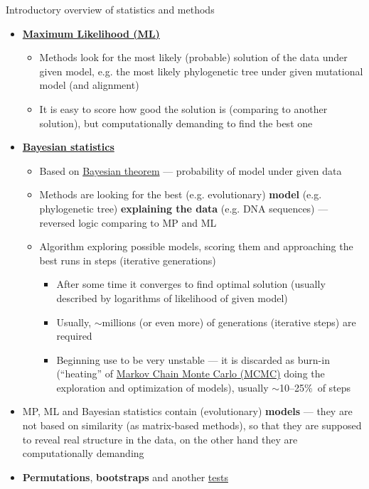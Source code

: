 \documentclass[compress, xelatex, 11pt, xcolor=svgnames, aspectratio=169,
	hyperref={
		bookmarks=true,
		unicode=true,
		colorlinks=true,
		pdftitle={Molecular data in R},
		plainpages=false,
		pdfauthor={Vojtech Zeisek},
		pdfsubject={Course about phylogeny and evolution in R},
		pdfcreator={XeLaTeX},
		pdfkeywords={R, evolution, phylogeny, molecular data},
		linkcolor=Crimson, %
		anchorcolor=Magenta, %
		citecolor=Magenta, %
		filecolor=Magenta, %
		menucolor=Magenta, %
		urlcolor=DodgerBlue, %
		},
	url={hyphens, lowtilde} %
	]{beamer}
\begin{document}
\begin{frame}[allowframebreaks]{Introductory overview of statistics and methods}
\begin{itemize}
\begin{itemize}
		\end{itemize}
		\item \textbf{\href{https://en.wikipedia.org/wiki/Maximum_likelihood_estimation}{Maximum Likelihood (ML)}}
		\begin{itemize}
			\item Methods look for the most likely (probable) solution of the data under given model, e.g. the most likely phylogenetic tree under given mutational model (and alignment)
			\item It is easy to score how good the solution is (comparing to another solution), but computationally demanding to find the best one
		\end{itemize}
		\item \textbf{\href{https://en.wikipedia.org/wiki/Bayesian_statistics}{Bayesian statistics}}
		\begin{itemize}
			\item Based on \href{https://en.wikipedia.org/wiki/Bayes_theorem}{Bayesian theorem} --- probability of model under given data
			\item Methods are looking for the best (e.g. evolutionary) \textbf{model} (e.g. phylogenetic tree) \textbf{explaining the data} (e.g. DNA sequences) --- reversed logic comparing to MP and ML
			\item Algorithm exploring possible models, scoring them and approaching the best runs in steps (iterative generations)
			\begin{itemize}
				\item After some time it converges to find optimal solution (usually described by logarithms of likelihood of given model)
				\item Usually, $\sim$millions (or even more) of generations (iterative steps) are required
				\item Beginning use to be very unstable --- it is discarded as burn-in (\enquote{heating} of \href{https://en.wikipedia.org/wiki/Markov_chain_Monte_Carlo}{Markov Chain Monte Carlo (MCMC)} doing the exploration and optimization of models), usually $\sim$10--25\%~of steps
			\end{itemize}
		\end{itemize}
		\item MP, ML and Bayesian statistics contain (evolutionary) \textbf{models} --- they are not based on similarity (as matrix-based methods), so that they are supposed to reveal real structure in the data, on the other hand they are computationally demanding
		\item \textbf{Permutations}, \textbf{bootstraps} and another \href{https://en.wikipedia.org/wiki/Resampling_(statistics)}{tests}

\end{itemize}
\end{frame}
\end{document}
